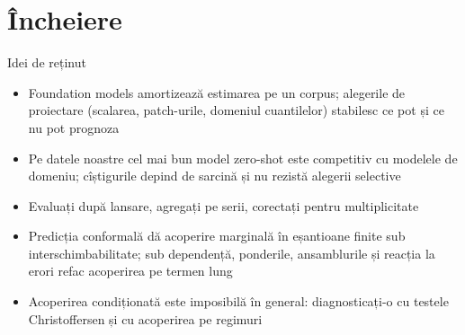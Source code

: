 \section{Încheiere}

\begin{frame}{Idei de reținut}
\itemsize{\small}
\begin{itemize}
    \item Foundation models amortizează estimarea pe un corpus; alegerile de proiectare (scalarea, patch-urile, domeniul cuantilelor) stabilesc ce pot și ce nu pot prognoza
    \item Pe datele noastre cel mai bun model zero-shot este competitiv cu modelele de domeniu; cîștigurile depind de sarcină și nu rezistă alegerii selective
    \item Evaluați după lansare, agregați pe serii, corectați pentru multiplicitate
    \item Predicția conformală dă acoperire marginală în eșantioane finite sub interschimbabilitate; sub dependență, ponderile, ansamblurile și reacția la erori refac acoperirea pe termen lung
    \item Acoperirea condiționată este imposibilă în general: diagnosticați-o cu testele Christoffersen și cu acoperirea pe regimuri
\end{itemize}
\end{frame}

